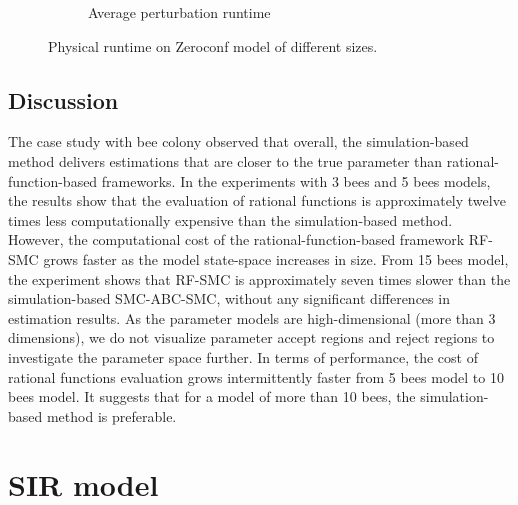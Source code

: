 \begin{figure}[H]
\begin{subfigure}{0.4\textwidth}
        \caption{Average perturbation runtime}
    \end{subfigure}
    \caption{Physical runtime on Zeroconf model of different sizes.}
\end{figure}
\subsection{Discussion}
The case study with bee colony observed that overall, the simulation-based method delivers
estimations that are closer to the true parameter than rational-function-based frameworks. In the
experiments with 3 bees and 5 bees models, the results show that the evaluation of rational
functions is approximately twelve times less computationally expensive than the simulation-based
method. However, the computational cost of the rational-function-based framework RF-SMC grows faster
as the model state-space increases in size. From 15 bees model, the experiment shows that RF-SMC is
approximately seven times slower than the simulation-based SMC-ABC-SMC, without any significant
differences in estimation results. As the parameter models are high-dimensional (more than 3
dimensions), we do not visualize parameter accept regions and reject regions to investigate the
parameter space further. In terms of performance,  the cost of rational functions evaluation grows
intermittently faster from 5 bees model to 10 bees model. It suggests that for a model of more than
10 bees, the simulation-based method is preferable.

\section{SIR model}
